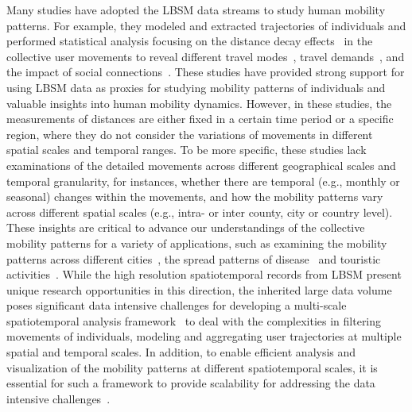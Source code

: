 \documentclass[ijgi,article,submit,moreauthors,pdftex,10pt,a4paper]{mdpi}
\theoremstyle{mdpi}
\newcounter{ex}
\newcounter{re}
\theoremstyle{mdpidefinition}
\begin{document}
Many studies have adopted the LBSM data streams to study human mobility patterns. For example, they modeled and extracted trajectories of individuals and performed statistical analysis focusing on the distance decay effects~\cite{gonzalez2008understanding} in the collective user movements to reveal different travel modes~\cite{Jurdak2015}, travel demands~\cite{wu2014intra,hasan2013understanding}, and the impact of social connections~\cite{cho2011friendship}.
These studies have provided strong support for using LBSM data as proxies for studying mobility patterns of individuals and valuable insights into human mobility dynamics. 
However, in these studies, the measurements of distances are either fixed in a certain time period or a specific region, where they do not consider the variations of movements in different spatial scales and temporal ranges.
To be more specific, these studies lack examinations of the detailed movements across different geographical scales and temporal granularity, for instances, whether there are temporal (e.g., monthly or seasonal) changes within the movements, and how the mobility patterns vary across different spatial scales (e.g., intra- or inter county, city or country level). 
These insights are critical to advance our understandings of the collective mobility patterns for a variety of applications, such as examining the mobility patterns across different cities~\cite{noulas2012tale}, the spread patterns of disease~\cite{balcan2009multiscale, tamerius2011global} and touristic activities~\cite{hawelka2014geo}.
While the high resolution spatiotemporal records from LBSM present unique research opportunities in this direction, the inherited large data volume poses significant data intensive challenges for developing a multi-scale spatiotemporal analysis framework~\cite{tsou2015} to deal with the complexities in filtering movements of individuals, modeling and aggregating user trajectories at multiple spatial and temporal scales.
In addition, to enable efficient analysis and visualization of the mobility patterns at different spatiotemporal scales, it is essential for such a framework to provide scalability for addressing the data intensive challenges~\cite{cao2014scalable}. 
\end{document}
